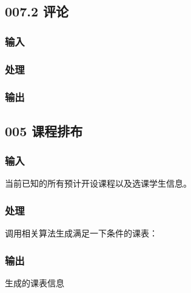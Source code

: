   \subsection{007.2 评论}
    \subsubsection{输入}
    \subsubsection{处理}
    \subsubsection{输出}

  \subsection{005 课程排布}
    \subsubsection{输入}
    当前已知的所有预计开设课程以及选课学生信息。
    \subsubsection{处理}
    调用相关算法生成满足一下条件的课表：
    \subsubsection{输出}
    生成的课表信息
